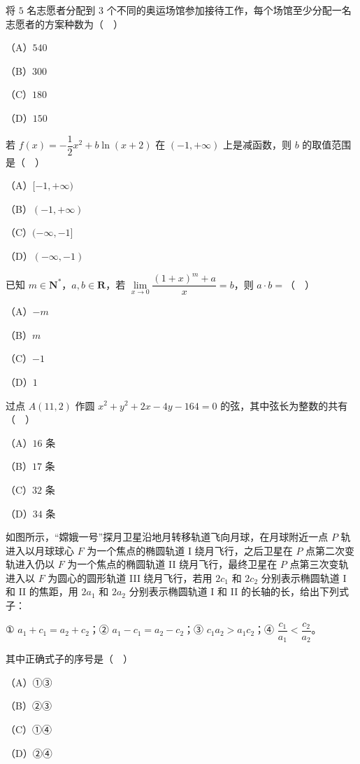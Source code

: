 \begin{question}
将 $5$ 名志愿者分配到 $3$ 个不同的奥运场馆参加接待工作，每个场馆至少分配一名志愿者的方案种数为（　）

（A）$540$

（B）$300$

（C）$180$

（D）$150$

\end{question}
\begin{question}
若 $f(x)=-\dfrac12x^2+b\ln(x+2)$ 在 $(-1,+\infty)$ 上是减函数，则 $b$ 的取值范围是（　）

（A）$[-1,+\infty)$

（B）$(-1,+\infty)$

（C）$(-\infty,-1]$

（D）$(-\infty,-1)$

\end{question}
\begin{question}
已知 $m\in\mathbf N^*$，$a,b\in\mathbf R$，若 $\lim\limits_{x\to0}\dfrac{(1+x)^m+a}x=b$，则 $a\cdot b=$（　）

（A）$-m$

（B）$m$

（C）$-1$

（D）$1$

\end{question}
\begin{question}
过点 $A(11,2)$ 作圆 $x^2+y^2+2x-4y-164=0$ 的弦，其中弦长为整数的共有（　）

（A）$16$ 条

（B）$17$ 条

（C）$32$ 条

（D）$34$ 条

\Needspace{0.4\textheight}
\end{question}
\begin{question}
如图所示，“嫦娥一号”探月卫星沿地月转移轨道飞向月球，在月球附近一点 $P$ 轨进入以月球球心 $F$ 为一个焦点的椭圆轨道 I 绕月飞行，之后卫星在 $P$ 点第二次变轨进入仍以 $F$ 为一个焦点的椭圆轨道 II 绕月飞行，最终卫星在 $P$ 点第三次变轨进入以 $F$ 为圆心的圆形轨道 III 绕月飞行，若用 $2c_1$ 和 $2c_2$ 分别表示椭圆轨道 I 和 II 的焦距，用 $2a_1$ 和 $2a_2$ 分别表示椭圆轨道 I 和 II 的长轴的长，给出下列式子：

① $a_1+c_1=a_2+c_2$；② $a_1-c_1=a_2-c_2$；③ $c_1a_2>a_1c_2$；④ $\dfrac{c_1}{a_1}<\dfrac{c_2}{a_2}$。

其中正确式子的序号是（　）

（A）①③

（B）②③

（C）①④

（D）②④
\nopagebreak[4]
\begin{center}\end{center}
\nopagebreak[4]
\end{question}

